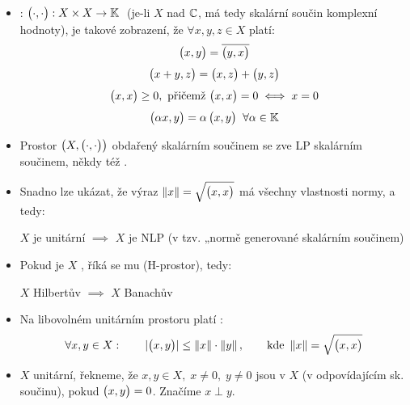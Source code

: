 \begin{itemize}
    \item {}: \hspace{1em} $\big( \cdot, \cdot \big): X \times X \to \mathbb{K} \;$ (je-li $X$ nad $\mathbb{C}$, má tedy skalární součin komplexní hodnoty), je takové zobrazení, že $\forall x, y, z \in X$ platí:
    \begin{gather*}
        \big( x, y \big) = \overline{\big( y, x \big)}
        \\[3pt]
        \big( x+y, z \big) = \big( x, z \big) + \big( y, z \big)
        \\[3pt]
        \big( x, x \big) \geq 0,
        \text{ přičemž }
        \big( x, x \big) = 0
        \iff x = 0
        \\[3pt]
        \big( \alpha x, y \big) =
        \alpha \, \big( x, y \big)
        \;\; \forall \alpha \in \mathbb{K}
    \end{gather*}
    
    \item Prostor $\big(X, \big( \cdot, \cdot \big)\big)$ obdařený skalárním součinem se zve LP skalárním součinem, někdy též .
    
    \item Snadno lze ukázat, že výraz $\left\lVert x\right\rVert = \sqrt{\big( x, x \big)}$ má všechny vlastnosti normy, a tedy:
    
    $X$ je unitární $\implies$ $X$ je NLP (v tzv. „normě generované skalárním součinem)
    
    \item Pokud je $X$ , říká se mu  (H-prostor), tedy:
    
    $X$ Hilbertův $\implies$ $X$ Banachův
    
    \item Na libovolném unitárním prostoru platí :
    $$
        \forall x,y \in X:
        \hspace{2em}
        |\big( x, y \big)| \leq \left\lVert x\right\rVert \cdot \left\lVert y\right\rVert,
        \hspace{2em}
        \text{kde }
        \left\lVert x\right\rVert = \sqrt{\big( x, x \big)}
    $$
    
    \item $X$ unitární, řekneme, že $x,y \in X, \; x \neq 0, \; y \neq 0$ jsou  v $X$ (v odpovídajícím sk. součinu), pokud $\big( x, y \big) = 0$. Značíme $x \perp y$.
\end{itemize}


